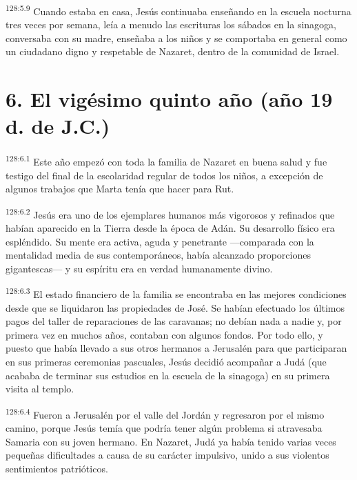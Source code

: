 \par
\textsuperscript{128:5.9} Cuando estaba en casa, Jesús continuaba enseñando en la escuela nocturna tres veces por semana, leía a menudo las escrituras los sábados en la sinagoga, conversaba con su madre, enseñaba a los niños y se comportaba en general como un ciudadano digno y respetable de Nazaret, dentro de la comunidad de Israel.

\section*{6. El vigésimo quinto año (año 19 d. de J.C.)}
\par
\textsuperscript{128:6.1} Este año empezó con toda la familia de Nazaret en buena salud y fue testigo del final de la escolaridad regular de todos los niños, a excepción de algunos trabajos que Marta tenía que hacer para Rut.

\par
\textsuperscript{128:6.2} Jesús era uno de los ejemplares humanos más vigorosos y refinados que habían aparecido en la Tierra desde la época de Adán. Su desarrollo físico era espléndido. Su mente era activa, aguda y penetrante ---comparada con la mentalidad media de sus contemporáneos, había alcanzado proporciones gigantescas--- y su espíritu era en verdad humanamente divino.

\par
\textsuperscript{128:6.3} El estado financiero de la familia se encontraba en las mejores condiciones desde que se liquidaron las propiedades de José. Se habían efectuado los últimos pagos del taller de reparaciones de las caravanas; no debían nada a nadie y, por primera vez en muchos años, contaban con algunos fondos. Por todo ello, y puesto que había llevado a sus otros hermanos a Jerusalén para que participaran en sus primeras ceremonias pascuales, Jesús decidió acompañar a Judá (que acababa de terminar sus estudios en la escuela de la sinagoga) en su primera visita al templo.

\par
\textsuperscript{128:6.4} Fueron a Jerusalén por el valle del Jordán y regresaron por el mismo camino, porque Jesús temía que podría tener algún problema si atravesaba Samaria con su joven hermano. En Nazaret, Judá ya había tenido varias veces pequeñas dificultades a causa de su carácter impulsivo, unido a sus violentos sentimientos patrióticos.


